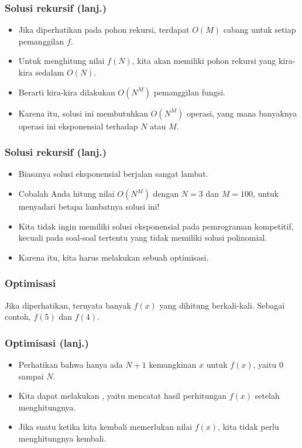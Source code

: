 \begin{frame}
\frametitle{Solusi rekursif (lanj.)}
\begin{itemize}
  \item Jika diperhatikan pada pohon rekursi, terdapat $O(M)$ cabang untuk setiap pemanggilan $f$.
  \item Untuk menghitung nilai $f(N)$, kita akan memiliki pohon rekursi yang kira-kira sedalam $O(N)$.
  \item Berarti kira-kira dilakukan $O(N^M)$ pemanggilan fungsi.
  \item Karena itu, solusi ini membutuhkan $O(N^M)$ operasi, yang mana banyaknya operasi ini eksponensial terhadap $N$ atau $M$.
\end{itemize}
\end{frame}

\begin{frame}
\frametitle{Solusi rekursif (lanj.)}
\begin{itemize}
  \item Biasanya solusi eksponensial berjalan sangat lambat.
  \item Cobalah Anda hitung nilai $O(N^M)$ dengan $N=3$ dan $M=100$, untuk menyadari betapa lambatnya solusi ini!
  \item Kita tidak ingin memiliki solusi eksponensial pada pemrograman kompetitif, kecuali pada soal-soal tertentu  yang tidak memiliki solusi polinomial. 
  \item Karena itu, kita harus melakukan sebuah optimisasi.
\end{itemize}
\end{frame}

\begin{frame}
\frametitle{Optimisasi}
Jika diperhatikan, ternyata banyak $f(x)$ yang dihitung berkali-kali. Sebagai contoh, $f(5)$ dan $f(4)$.
\begin{center}
\scalebox{0.8}{
\Tree [.$f(12)$
  [.$f(2)$
    [.$f(1)$
      [.$f(0)$ ]
    ]
  ]
  [.$f(6)$
    [.$f(0)$ ]
    [.$f(5)$
      [.$f(4)$
        [.$...$
        ]
      ]
    ]
  ]
  [.$f(11)$
    [.$f(1)$
      [.$f(0)$ ]
    ]
    [.$f(5)$
      [.$f(4)$
        [.$...$          
        ]
      ]
    ]
    [.$f(10)$ 
      [.$f(0)$ 
        [.$...$ ]      
      ]
      [.$f(4)$ 
        [.$...$ ]      
      ]
      [.$f(9)$ 
        [.$...$ ]      
      ]
    ]
  ]
]
}
\end{center}
\end{frame}

\begin{frame}
\frametitle{Optimisasi (lanj.)}
\begin{itemize}
  \item Perhatikan bahwa hanya ada $N + 1$ kemungkinan $x$ untuk $f(x)$, yaitu $0$ sampai $N$.
  
  \item Kita dapat melakukan , yaitu mencatat hasil perhitungan $f(x)$ setelah menghitungnya.
  \item Jika suatu ketika kita kembali memerlukan nilai $f(x)$, kita tidak perlu menghitungnya kembali.
\end{itemize}
\end{frame}

